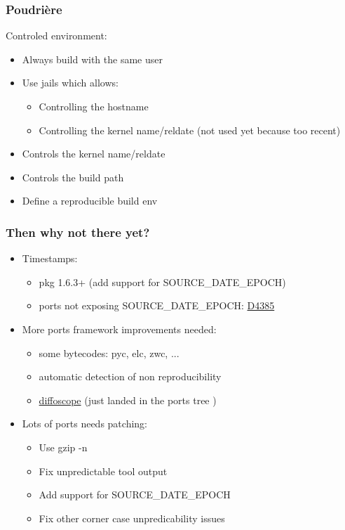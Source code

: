 \begin{frame}
	\frametitle{Poudrière}
	Controled environment:
	\begin{itemize}
		\item Always build with the same user
			\pause
		\item Use jails which allows:
			\begin{itemize}
				\item Controlling the hostname
				\item Controlling the kernel name/reldate (not used yet because too recent)
			\end{itemize}
			\pause
		\item Controls the kernel name/reldate
			\pause
		\item Controls the build path
			\pause
		\item Define a reproducible build env
	\end{itemize}
\end{frame}

\begin{frame}
	\frametitle{Then why not there yet?}
	\begin{itemize}
		\pause
		\item Timestamps:
			\begin{itemize}
				\item pkg 1.6.3+ (add support for SOURCE\_DATE\_EPOCH)
				\item ports not exposing SOURCE\_DATE\_EPOCH: \href{https://reviews.freebsd.org/D4385}{D4385}
			\end{itemize}
		\pause
		\item More ports framework improvements needed:
			\begin{itemize}
				\item some bytecodes: pyc, elc, zwc, ...
				\item automatic detection of non reproducibility
				\item \href{https://diffoscope.org/}{diffoscope} (just landed in the ports tree )
			\end{itemize}
		\pause
		\item Lots of ports needs patching:
			\begin{itemize}
				\item Use gzip -n
				\item Fix unpredictable tool output
				\item Add support for SOURCE\_DATE\_EPOCH
				\item Fix other corner case unpredicability issues
			\end{itemize}
	\end{itemize}
\end{frame}

